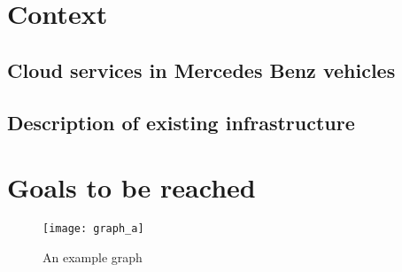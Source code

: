 \section{Context}
\subsection{Cloud services in Mercedes Benz vehicles}
\lipsum[2-4]

\subsection{Description of existing infrastructure}
\lipsum[2-4]

\section{Goals to be reached}
\lipsum[2-4]
\begin{figure}[h]
\centering
\texttt{[image: graph\_a]}
\caption{An example graph}
\label{fig:x cubed graph}
\end{figure}
\lipsum[2-4]

